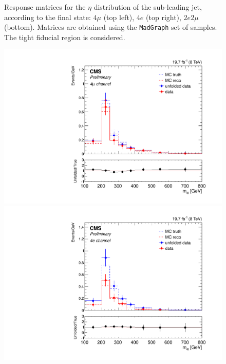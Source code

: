 \begin{figure}[hbtp]
\begin{center}
    \caption{Response matrices for the $\eta$ distribution of the sub-leading jet, according to the final state:  $4\mu$ (top left), $4e$ (top right), $2e2\mu$  (bottom). Matrices are obtained using the  \texttt{MadGraph} set of samples. The tight fiducial region is considered.} 
    \label{fig:EtaJet2_matrices}
  \end{center}
\end{figure}
\clearpage

\begin{figure}[hbtp]
  \begin{center}
    \includegraphics[width=\cmsFigWidth]{Figures/Mass_ZZTo4m_Pow_fr_binwidth}
    \includegraphics[width=\cmsFigWidth]{Figures/Mass_ZZTo4e_Pow_fr_binwidth}

\end{center}
\end{figure}
